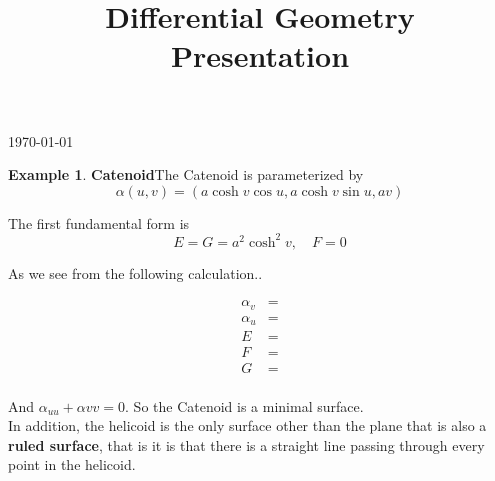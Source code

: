 \documentclass[12pt]{amsart}
\title{Differential Geometry \\
	\large Presentation
}
\theoremstyle{definition}
\newtheorem{example}[theorem]{Example}
\renewcommand{\a}{\alpha}
\begin{document}
\maketitle

\begin{center}
\today
\end{center}

\begin{example}{\textbf{Catenoid}}\label{Catenoid}
	The Catenoid  is parameterized by
	$$\a(u,v)=(a\cosh v \cos u , a \cosh v \sin u , av)$$
	
	The first fundamental form is 
	$$E = G = a^2\cosh^2v, \quad F = 0$$
	
	As we see from the following calculation..
	
	\begin{align*}
	\a_v&= \\
	\a_u&=\\
	E&=\\
	F&=\\
	G&=\\
	\end{align*}	

	
	
	And $\a_{uu}+\a{vv}=0$. So the Catenoid is a minimal surface.\\

	In addition, the helicoid is the only surface other than the plane that is also a \textbf{ruled surface}, that is it is that there is a straight line passing through every point in the helicoid.


\end{example}
\end{document}
